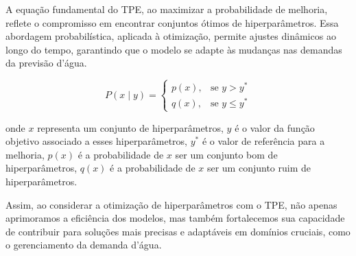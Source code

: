 A equação fundamental do TPE, ao maximizar a probabilidade de melhoria, reflete o compromisso em encontrar conjuntos ótimos de hiperparâmetros. Essa abordagem probabilística, aplicada à otimização, permite ajustes dinâmicos ao longo do tempo, garantindo que o modelo se adapte às mudanças nas demandas da previsão d'água.

$$ P(x \mid y) = \begin{cases} 
	p(x), & \text{se } y > y^* \\
	q(x), & \text{se } y \leq y^*
\end{cases} $$

\noindent onde $ x $ representa um conjunto de hiperparâmetros, $ y $ é o valor da função objetivo associado a esses hiperparâmetros, $ y^* $ é o valor de referência para a melhoria, $ p(x) $ é a probabilidade de $ x $ ser um conjunto bom de hiperparâmetros, $ q(x) $ é a probabilidade de $ x $ ser um conjunto ruim de hiperparâmetros.

Assim, ao considerar a otimização de hiperparâmetros com o TPE, não apenas aprimoramos a eficiência dos modelos, mas também fortalecemos sua capacidade de contribuir para soluções mais precisas e adaptáveis em domínios cruciais, como o gerenciamento da demanda d'água.
